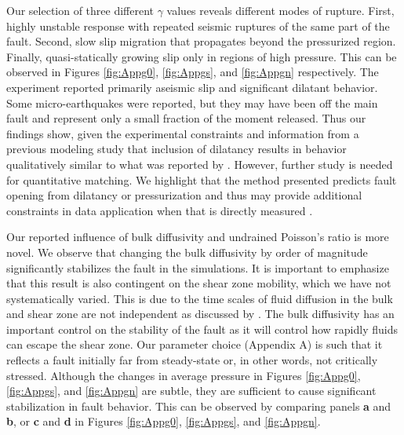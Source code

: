 \documentclass[draft]{agujournal2019}
\begin{document}
Our selection of three different $\gamma$ values reveals different modes of rupture. First, highly unstable response with repeated seismic ruptures of the same part of the fault. Second, slow slip migration that propagates beyond the pressurized region. Finally, quasi-statically growing slip only in regions of high pressure. This can be observed in Figures \ref{fig:Appg0}, \ref{fig:Appgs}, and \ref{fig:Appgn} respectively. The  experiment reported primarily aseismic slip and significant dilatant behavior. Some micro-earthquakes were reported, but they may have been off the main fault and represent only a small fraction of the moment released. Thus our findings show, given the experimental constraints and information from a previous modeling study \cite{Larochelle2021} that inclusion of dilatancy results in behavior qualitatively similar to what was reported by . However, further study is needed for quantitative matching. We highlight that the method presented predicts fault opening from dilatancy or pressurization and thus may provide additional constraints in data application when that is directly measured \cite{Cappa2019}.

Our reported influence of bulk diffusivity and undrained Poisson's ratio is more novel. We observe that changing the bulk diffusivity by order of magnitude significantly stabilizes the fault in the simulations. It is important to emphasize that this result is also contingent on the shear zone mobility, which we have not systematically varied. This is due to the time scales of fluid diffusion in the bulk and shear zone are not independent as discussed by . The bulk diffusivity has an important control on the stability of the fault as it will control how rapidly fluids can escape the shear zone. Our parameter choice (Appendix A) is such that it reflects a fault initially far from steady-state or, in other words, not critically stressed. Although the changes in average pressure in Figures  \ref{fig:Appg0}, \ref{fig:Appgs}, and \ref{fig:Appgn} are subtle, they are sufficient to cause significant stabilization in fault behavior. This can be observed by comparing panels {\bf a} and {\bf b}, or {\bf c} and {\bf d} in Figures \ref{fig:Appg0}, \ref{fig:Appgs}, and \ref{fig:Appgn}. 
\end{document}
